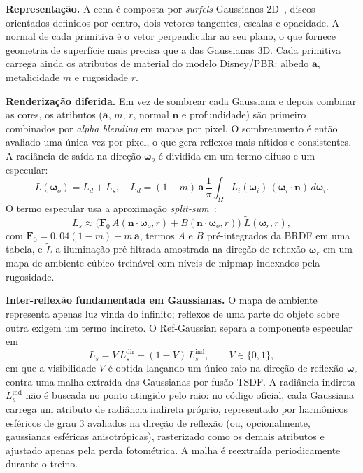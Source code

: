 \documentclass[conference]{IEEEtran}
\begin{document}
\textbf{Representação.} A cena é composta por \textit{surfels} Gaussianos 2D~\cite{huang2024_2dgs}, discos orientados definidos por centro, dois vetores tangentes, escalas e opacidade. A normal de cada primitiva é o vetor perpendicular ao seu plano, o que fornece geometria de superfície mais precisa que a das Gaussianas 3D. Cada primitiva carrega ainda os atributos de material do modelo Disney/PBR: albedo $\mathbf{a}$, metalicidade $m$ e rugosidade $r$.

\textbf{Renderização diferida.} Em vez de sombrear cada Gaussiana e depois combinar as cores, os atributos ($\mathbf{a}$, $m$, $r$, normal $\mathbf{n}$ e profundidade) são primeiro combinados por \textit{alpha blending} em mapas por pixel. O sombreamento é então avaliado uma única vez por pixel, o que gera reflexos mais nítidos e consistentes. A radiância de saída na direção $\boldsymbol{\omega}_o$ é dividida em um termo difuso e um especular:
\begin{equation}
L(\boldsymbol{\omega}_o) = L_d + L_s, \quad L_d = (1-m)\,\mathbf{a}\, \frac{1}{\pi}\!\int_{\Omega} L_i(\boldsymbol{\omega}_i)\,(\boldsymbol{\omega}_i\cdot\mathbf{n})\,d\boldsymbol{\omega}_i .
\end{equation}
O termo especular usa a aproximação \textit{split-sum}~\cite{karis2013}:
\begin{equation}
L_s \approx \big(\mathbf{F}_0\,A(\mathbf{n}\cdot\boldsymbol{\omega}_o, r) + B(\mathbf{n}\cdot\boldsymbol{\omega}_o, r)\big)\; \tilde{L}(\boldsymbol{\omega}_r, r),
\end{equation}
com $\mathbf{F}_0 = 0{,}04(1-m) + m\,\mathbf{a}$, termos $A$ e $B$ pré-integrados da BRDF em uma tabela, e $\tilde{L}$ a iluminação pré-filtrada amostrada na direção de reflexão $\boldsymbol{\omega}_r$ em um mapa de ambiente cúbico treinável com níveis de mipmap indexados pela rugosidade.

\textbf{Inter-reflexão fundamentada em Gaussianas.} O mapa de ambiente representa apenas luz vinda do infinito; reflexos de uma parte do objeto sobre outra exigem um termo indireto. O Ref-Gaussian separa a componente especular em
\begin{equation}
L_s = V\,L_s^{\text{dir}} + (1-V)\,L_s^{\text{ind}}, \qquad V\in\{0,1\},
\label{eq:vis}
\end{equation}
em que a visibilidade $V$ é obtida lançando um único raio na direção de reflexão $\boldsymbol{\omega}_r$ contra uma malha extraída das Gaussianas por fusão TSDF. A radiância indireta $L_s^{\text{ind}}$ não é buscada no ponto atingido pelo raio: no código oficial, cada Gaussiana carrega um atributo de radiância indireta próprio, representado por harmônicos esféricos de grau 3 avaliados na direção de reflexão (ou, opcionalmente, gaussianas esféricas anisotrópicas), rasterizado como os demais atributos e ajustado apenas pela perda fotométrica. A malha é reextraída periodicamente durante o treino.
\end{document}
